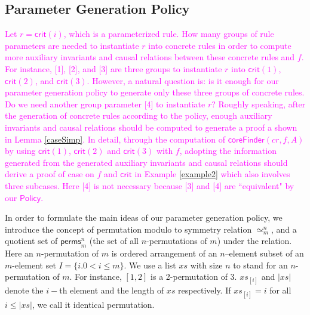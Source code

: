 \documentclass[conference]{IEEEtran}
\newcommand\lyj[1]{\textcolor{magenta}{ #1}}
\newcommand\caicomment[1]{\textcolor{red}{comment: #1} }
\begin{document}


\subsection{Parameter Generation Policy}\label{sec:parameterGenPolicy}
\lyj{Let $r=\mathsf{crit}(i)$, which is a parameterized rule. How many groups of rule parameters  are needed to instantiate $r$ into concrete rules in order to compute more auxiliary invariants and causal relations between these concrete rules and $f$. For instance, [1], [2], and [3] are three groups to instantiate $r$ into $\mathsf{crit}(1)$, $\mathsf{crit}(2)$, and $\mathsf{crit}(3)$. However, a natural question is: is it enough for our parameter generation policy to generate only these three groups of concrete rules. Do we need another group parameter [4] to instantiate $r$? Roughly speaking, after the generation of concrete rules according to the policy, enough auxiliary invariants and causal relations should be computed to generate  a proof a shown in Lemma \ref{caseSimp}. In detail, through the computation of $\mathsf{coreFinder}(cr,  f, A)$ by using $\mathsf{crit}(1)$, $\mathsf{crit}(2)$ and $\mathsf{crit}(3)$ with $f$, adopting the information generated from the generated auxiliary invariants and causal relations should derive a proof of case on $f$ and $\mathsf{crit}$ in Example \ref{example2} which also involves three subcases. Here [4] is not necessary because [3] and [4] are ``equivalent" by our $\mathsf{Policy}$.}

In order to formulate the main ideas of our parameter generation policy, we introduce the concept of permutation modulo to symmetry relation $\simeq_m^n$,  and a quotient set of $\mathsf{perms}_{m}^{n}$ (the set of all $n$-permutations of $m$) under the  relation.  Here an $n$-permutation of $m$ is ordered arrangement of  an $n$--element subset of an $m$-element set $I=\{i. 0<i\le m\}$. We use a list $xs$ with size $n$ to stand for an $n$-permutation of $m$. For instance, $[1,2]$ is a 2-permutation of 3. $xs_{[i]}$ and $|xs|$  denote  the $i-$th element and the length of $xs$ respectively. If $xs_{[i]}=i$ for all $i \le |xs|$, we call it identical permutation. %
\end{document}
